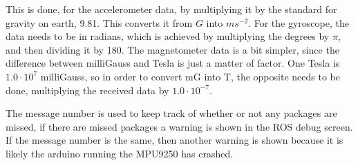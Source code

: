 This is done, for the accelerometer data, by multiplying it by the standard for gravity on earth, 9.81.
This converts it from $G$ into $ms^{-2}$.
For the gyroscope, the data needs to be in radians, which is achieved by multiplying the degrees by $\pi$, and then dividing it by 180.
The magnetometer data is a bit simpler, since the difference between milliGauss and Tesla is just a matter of factor.
One Tesla is $1.0 \cdot 10^{7}$ milliGauss, so in order to convert mG into T, the opposite needs to be done, multiplying the received data by  $1.0 \cdot 10^{-7}$.

The message number is used to keep track of whether or not any packages are missed, if there are missed packages a warning is shown in the ROS debug screen.
If the message number is the same, then another warning is shown because it is likely the arduino running the MPU9250 has crashed.


\newpage